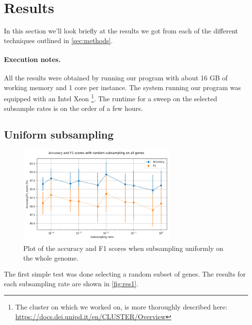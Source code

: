 \section{Results}
\label{sec:results}
In this section we'll look briefly at the results we got from each of the different techniques outlined in \autoref{sec:methods}.

\paragraph{Execution notes.}
All the results were obtained by running our program with about 16 GB of working memory and 1 core per instance. The system running our program was equipped with an Intel Xeon \footnote{The cluster on which we worked on, is more thoroughly described here: \url{https://docs.dei.unipd.it/en/CLUSTER/Overview}}. The runtime for a sweep on the selected subsample rates is on the order of a few hours.

\subsection{Uniform subsampling}
\begin{figure}[ht]
    \begin{center}
\includegraphics[width=8cm]{figures/subsample_plot.png}
    \end{center}
\caption{Plot of the accuracy and F1 scores when subsampling uniformly on the whole genome.}
\label{fig:res1}
\end{figure}

The first simple test was done selecting a random subset of genes. The results for each subsampling rate are shown in \autoref{fig:res1}.




